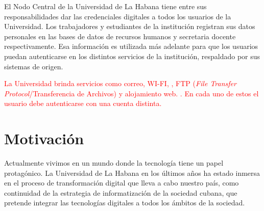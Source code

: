  

El Nodo Central de la Universidad de La Habana tiene entre sus responsabilidades dar las credenciales digitales a todos los usuarios de la Universidad. Los trabajadores y estudiantes de la institución registran sus datos personales en las bases de datos de recursos humanos y secretaria docente respectivamente. Esa información es utilizada más adelante para que los usuarios puedan autenticarse en los distintos servicios de la institución, respaldado por sus sistemas de origen.

\textcolor{red}{La Universidad brinda servicios como correo, WI-FI, , FTP (\textit{File Transfer Protocol}/Transferencia de Archivos) y alojamiento web. . En cada uno de estos el usuario debe autenticarse con una cuenta distinta.}

\section*{Motivación}
Actualmente vivimos en un mundo donde la tecnología tiene un papel protagónico. La Universidad de La Habana en los últimos años ha estado inmersa en el proceso de transformación digital que lleva a cabo nuestro país, como continuidad de la estrategia de informatización de la sociedad cubana, que pretende integrar las tecnologías digitales a todos los ámbitos de la sociedad.

